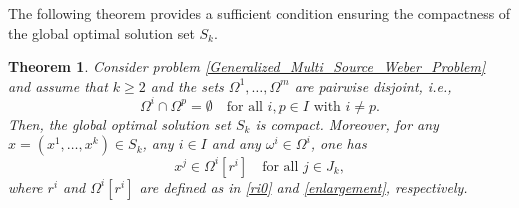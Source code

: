 \documentclass[sn-mathphys-num]{sn-jnl}%
\newtheorem{theorem}{Theorem}[section]
\theoremstyle{definition}
\begin{document}
The following theorem provides a sufficient condition ensuring the compactness of the global optimal solution set $S_k$.

\begin{theorem}
	\label{G.O.Solutions_11}
	Consider problem \eqref{Generalized_Multi_Source_Weber_Problem} and
	assume that $k\geq 2$ and the sets $\Omega^1,\dots,\Omega^m$ are pairwise disjoint, i.e.,
	$$\Omega^i \cap \Omega^p = \emptyset\quad\text{for all }i,p \in I\text{ with }i \neq p.$$  
	Then, the global optimal solution set $S_k$ is compact.
	Moreover, for any $x=(x^1,\dots,x^k) \in S_k$, any $i\in I$ and any $\omega^i\in \Omega^i$, one has
	\begin{equation}\label{key999}
	x^j \in \Omega^{i}[r^{i}] \quad \text{for all } j \in J_k,    
	\end{equation}
		where $r^{i}$ and $\Omega^{i}[r^{i}]$ are defined as in \eqref{ri0} and \eqref{enlargement}, respectively. 
\end{theorem}
\end{document}
